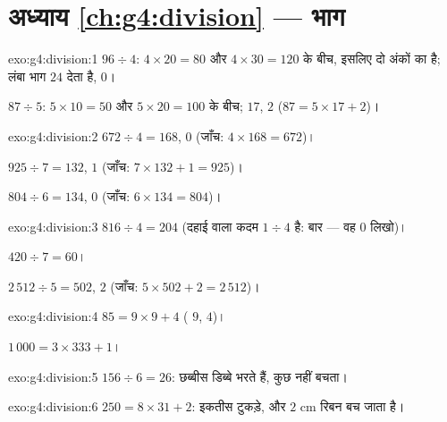 \section*{अध्याय \ref{ch:g4:division} --- भाग}

\begin{solution}{exo:g4:division:1}
$96 \div 4$: $4 \times 20 = 80$ और $4 \times 30 = 120$ के बीच,
इसलिए  दो अंकों का है; लंबा भाग $24$ देता है, 
$0$।

$87 \div 5$: $5 \times 10 = 50$ और $5 \times 20 = 100$ के बीच;
 $17$,  $2$ ($87 = 5 \times 17 + 2$)।
\end{solution}

\begin{solution}{exo:g4:division:2}
$672 \div 4 = 168$,  $0$ (जाँच: $4 \times 168 = 672$)।

$925 \div 7 = 132$,  $1$ (जाँच:
$7 \times 132 + 1 = 925$)।

$804 \div 6 = 134$,  $0$ (जाँच: $6 \times 134 = 804$)।
\end{solution}

\begin{solution}{exo:g4:division:3}
$816 \div 4 = 204$ (दहाई वाला कदम $1 \div 4$ है:  बार ---
वह $0$ लिखो)।

$420 \div 7 = 60$।

$2\,512 \div 5 = 502$,  $2$ (जाँच:
$5 \times 502 + 2 = 2\,512$)।
\end{solution}

\begin{solution}{exo:g4:division:4}
$85 = 9 \times 9 + 4$ ( $9$,  $4$)।

$1\,000 = 3 \times 333 + 1$।
\end{solution}

\begin{solution}{exo:g4:division:5}
$156 \div 6 = 26$: छब्बीस डिब्बे भरते हैं, कुछ नहीं बचता।
\end{solution}

\begin{solution}{exo:g4:division:6}
$250 = 8 \times 31 + 2$: इकतीस टुकड़े, और $2$ cm रिबन बच
जाता है।
\end{solution}

